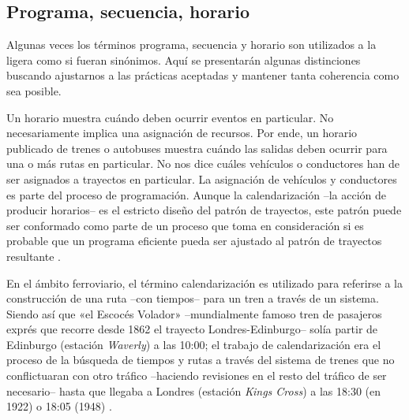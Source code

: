 \documentclass[draft,12pt,headsepline,footsepline,paper=letter]{scrreprt}
\begin{document}
\subsection{Programa, secuencia, horario}
\label{sub:programa_secuencia_horario}

Algunas veces los términos programa, secuencia y horario son utilizados a la ligera como si fueran sinónimos. Aquí se presentarán algunas distinciones buscando ajustarnos a las prácticas aceptadas y mantener tanta coherencia como sea posible.

Un horario muestra cuándo deben ocurrir eventos en particular. No necesariamente implica una asignación de recursos. Por ende, un horario publicado de trenes o autobuses muestra cuándo las salidas deben ocurrir para una o más rutas en particular. No nos dice cuáles vehículos o conductores han de ser asignados a trayectos en particular. La asignación de vehículos y conductores es parte del proceso de programación. Aunque la calendarización –la acción de producir horarios– es el estricto diseño del patrón de trayectos, este patrón puede ser conformado como parte de un proceso que toma en consideración si es probable que un programa eficiente pueda ser ajustado al patrón de trayectos resultante \cite[p.~48]{wren95scheduling-timetabling}.

En el ámbito ferroviario, el término calendarización es utilizado para referirse a la construcción de una ruta –con tiempos– para un tren a través de un sistema. Siendo así que «el Escocés Volador» –mundialmente famoso tren de pasajeros exprés que recorre desde 1862 el trayecto Londres-Edinburgo– solía partir de Edinburgo (estación \textit{Waverly}) a las 10:00; el trabajo de calendarización era el proceso de la búsqueda de tiempos y rutas a través del sistema de trenes que no conflictuaran con otro tráfico –haciendo revisiones en el resto del tráfico de ser necesario– hasta que llegaba a Londres (estación \textit{Kings Cross}) a las 18:30 (en 1922) o 18:05 (1948) \citep[p.~48, 49]{wren95scheduling-timetabling}.
\end{document}
